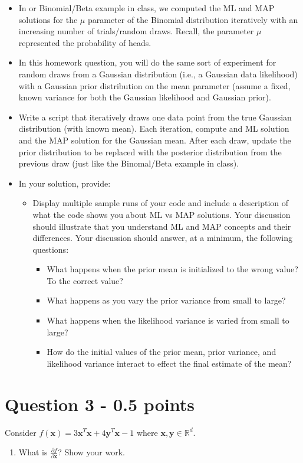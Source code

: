 \documentclass[11pt]{article}
\begin{document}
\begin{itemize}
	\item In or Binomial/Beta example in class, we computed the ML and MAP solutions for the $\mu$ parameter of the Binomial distribution iteratively with an increasing number of trials/random draws. Recall, the parameter $\mu$ represented the probability of heads.
	\item In this homework question, you will do the same sort of experiment for random draws from a Gaussian distribution (i.e., a Gaussian data likelihood) with a Gaussian prior distribution on the mean parameter (assume a fixed, known variance for both the Gaussian likelihood and Gaussian prior).
	\item Write a script that iteratively draws one data point from the true Gaussian distribution (with known mean). Each iteration, compute and ML solution and the MAP solution for the Gaussian mean. After each draw, update the prior distribution to be replaced with the posterior distribution from the previous draw (just like the Binomal/Beta example in class).
	\item In your solution, provide:
		\begin{itemize}
			\item Display multiple sample runs of your code and include a description of what the code shows you about ML vs MAP solutions. Your discussion should illustrate that you understand ML and MAP concepts and their differences. Your discussion should answer, at a minimum, the following questions:
			\begin{itemize}
				\item What happens when the prior mean is initialized to the wrong value? To the correct value?
				\item What happens as you vary the prior variance from small to large?
				\item What happens when the likelihood variance is varied from small to large?
				\item How do the initial values of the prior mean, prior variance, and likelihood variance interact to effect the final estimate of the mean?
			\end{itemize}
		\end{itemize}
\end{itemize}

\section*{Question 3 - 0.5 points}
Consider $f(\mathbf{x}) = 3\mathbf{x}^T\mathbf{x} + 4\mathbf{y}^T\mathbf{x} - 1$ where $\mathbf{x}, \mathbf{y} \in \mathbb{R}^d$. 
\begin{enumerate} 
\item What is $\frac{\partial f}{\partial\mathbf{x}}$? Show your work. 
\end{enumerate}
\end{document}
